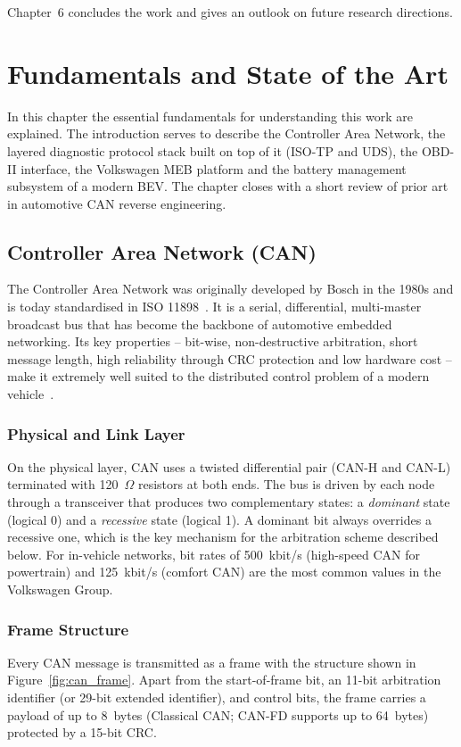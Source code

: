 \documentclass[11pt,a4paper,oneside,parskip=half]{scrreprt}
\begin{document}
Chapter~6 concludes the work and gives an outlook on future research directions.

\chapter{Fundamentals and State of the Art}
In this chapter the essential fundamentals for understanding this work are explained. The introduction serves to describe the Controller Area Network, the layered diagnostic protocol stack built on top of it (ISO-TP and UDS), the OBD-II interface, the Volkswagen MEB platform and the battery management subsystem of a modern BEV. The chapter closes with a short review of prior art in automotive CAN reverse engineering.

\section{Controller Area Network (CAN)}
The Controller Area Network was originally developed by Bosch in the 1980s and is today standardised in ISO 11898~\cite{iso11898}. It is a serial, differential, multi-master broadcast bus that has become the backbone of automotive embedded networking. Its key properties -- bit-wise, non-destructive arbitration, short message length, high reliability through CRC protection and low hardware cost -- make it extremely well suited to the distributed control problem of a modern vehicle~\cite{zimmermann2014bosch,reif2014automotive}.

\subsection{Physical and Link Layer}
On the physical layer, CAN uses a twisted differential pair (CAN-H and CAN-L) terminated with 120~$\Omega$ resistors at both ends. The bus is driven by each node through a transceiver that produces two complementary states: a \textit{dominant} state (logical 0) and a \textit{recessive} state (logical 1). A dominant bit always overrides a recessive one, which is the key mechanism for the arbitration scheme described below. For in-vehicle networks, bit rates of 500~kbit/s (high-speed CAN for powertrain) and 125~kbit/s (comfort CAN) are the most common values in the Volkswagen Group.

\subsection{Frame Structure}
Every CAN message is transmitted as a frame with the structure shown in Figure~\ref{fig:can_frame}. Apart from the start-of-frame bit, an 11-bit arbitration identifier (or 29-bit extended identifier), and control bits, the frame carries a payload of up to 8~bytes (Classical CAN; CAN-FD supports up to 64~bytes) protected by a 15-bit CRC.
\end{document}
